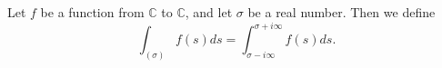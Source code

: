 \begin{definition}[VerticalIntegral]
\label{VerticalIntegral}
\leanok
Let $f$ be a function from $\mathbb{C}$ to $\mathbb{C}$,
  and let $\sigma$ be a real number. Then we define
  $$\int_{(\sigma)}f(s)ds =
    \int_{\sigma-i\infty}^{\sigma+i\infty}f(s)ds.$$
\end{definition}
